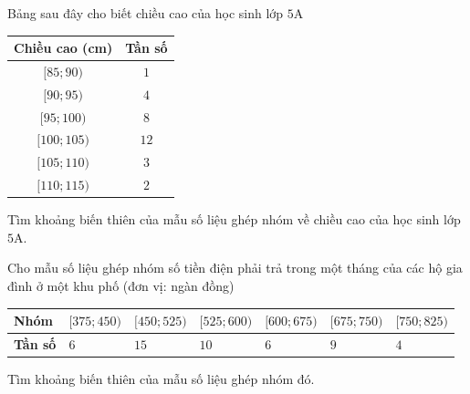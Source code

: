 \begin{bt}%
	Bảng sau đây cho biết chiều cao của học sinh lớp $5$A
	\begin{center}
		\begin{tabular}{|c|c|}
			\hline
			Chiều cao (cm) & Tần số \\
			\hline
			$[85;90)$ & $1$\\
			\hline
			$[90;95)$ & $4$\\
			\hline
			$[95;100)$ & $8$\\
			\hline
			$[100;105)$ & $12$\\
			\hline
			$[105;110)$ & $3$\\
			\hline
			$[110;115)$ & $2$\\
			\hline
		\end{tabular}
	\end{center}
	Tìm khoảng biến thiên của mẫu số liệu ghép nhóm về chiều cao của học sinh lớp $5$A.
\end{bt}

\begin{bt}%

Cho mẫu số liệu ghép nhóm số tiền điện phải trả trong một tháng của các hộ gia đình ở một khu phố (đơn vị: ngàn đồng)
\begin{center}
\begin{tabular}{|>{\centering\arraybackslash}m{2cm}|>{\centering\arraybackslash}m{2cm}|>{\centering\arraybackslash}m{2cm}|>{\centering\arraybackslash}m{2cm}|>{\centering\arraybackslash}m{2cm}|>{\centering\arraybackslash}m{2cm}|>{\centering\arraybackslash}m{2cm}|}
\hline
\textbf{Nhóm} & $[375;450)$ & $[450;525)$ & $[525;600)$ & $[600;675)$& $[675;750)$& $[750;825)$\\
\hline
\textbf{Tần số} & $6$ & $15$ & $10$ & $6$ & $9$ & $4$\\
\hline
\end{tabular}
\end{center}
Tìm khoảng biến thiên của mẫu số liệu ghép nhóm đó.
\end{bt}

